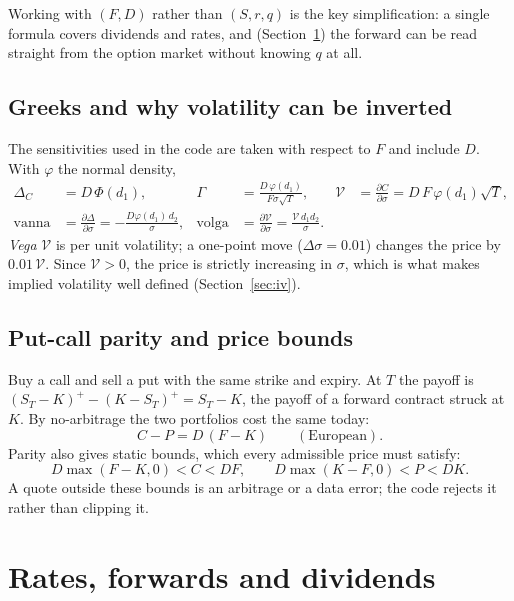 \documentclass[11pt]{article}
\newcommand{\Norm}{\Phi}
\begin{document}
Working with $(F,D)$ rather than $(S,r,q)$ is the key simplification: a single
formula covers dividends and rates, and (Section~\ref{sec:forward}) the forward
can be read straight from the option market without knowing $q$ at all.

\subsection{Greeks and why volatility can be inverted}

The sensitivities used in the code are taken with respect to $F$ and include $D$.
With $\varphi$ the normal density,
\begin{align}
  \Delta_C&=D\,\Norm(d_1), & \Gamma&=\frac{D\,\varphi(d_1)}{F\sigma\sqrt T}, &
  \mathcal V&=\frac{\partial C}{\partial\sigma}=D\,F\,\varphi(d_1)\sqrt T,\\
  \text{vanna}&=\frac{\partial\Delta}{\partial\sigma}=-\frac{D\varphi(d_1)\,d_2}{\sigma}, &
  \text{volga}&=\frac{\partial\mathcal V}{\partial\sigma}=\frac{\mathcal V\,d_1d_2}{\sigma}.&&
\end{align}
\emph{Vega} $\mathcal V$ is per unit volatility; a one-point move
($\Delta\sigma=0.01$) changes the price by $0.01\,\mathcal V$. Since
$\mathcal V>0$, the price is strictly increasing in $\sigma$, which is what makes
implied volatility well defined (Section~\ref{sec:iv}).

\subsection{Put-call parity and price bounds}\label{sec:parity}

Buy a call and sell a put with the same strike and expiry. At $T$ the payoff is
$(S_T-K)^+-(K-S_T)^+=S_T-K$, the payoff of a forward contract struck at $K$. By
no-arbitrage the two portfolios cost the same today:
\begin{equation}\label{eq:parity}
  C-P=D\,(F-K)\qquad(\text{European}).
\end{equation}
Parity also gives static bounds, which every admissible price must satisfy:
\begin{equation}
  D\max(F-K,0)<C<DF,\qquad D\max(K-F,0)<P<DK.
\end{equation}
A quote outside these bounds is an arbitrage or a data error; the code rejects
it rather than clipping it.

\section{Rates, forwards and dividends}\label{sec:forward}
\end{document}
